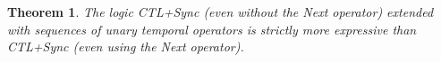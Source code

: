 \documentclass{article}
\newtheorem{theorem}{Theorem}
\begin{document}
\begin{comment}
\begin{figure}[!tb]\begin{center}
    \hrule
		\hrule
	\end{center}
	\caption{States  and  are indistinguishable by formulas of CTL+Sync with the Next operator,
of nesting depth at most .\label{fig:next}}\end{figure}
\end{comment}

\begin{theorem}\label{theo:CTL+Sync-extended-expressive-power-2}
The logic CTL+Sync (even without the Next operator) extended with sequences of unary 
temporal operators is strictly more expressive than CTL+Sync (even using the Next operator).
\end{theorem}
\end{document}
